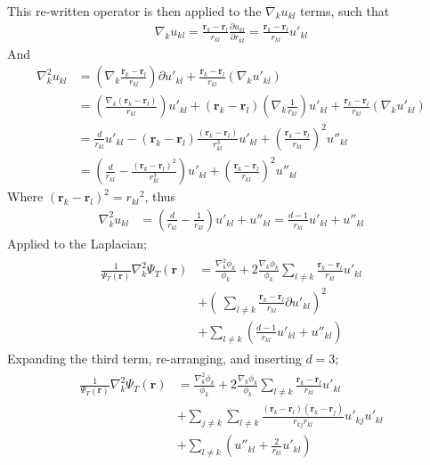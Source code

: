 \documentclass[%
oneside,                 %
final,                   %
10pt]{article}
\begin{document}
\begin{appendices}
\begin{align*}
\end{align*}
This re-written operator is then applied to the $\nabla_k u_{kl}$ terms, such that
\begin{align*}
\nabla_k u_{kl} = \frac{\bm r_k - \bm r_l}{r_{kl}} \frac{\partial u_{kl}}{\partial r_{kl}} = \frac{\bm r_k - \bm r_l}{r_{kl}}  u'_{kl}
\end{align*}
And
\begin{align*}
\nabla_k^2 u_{kl} 
&= \left( \nabla_k  \frac{\bm r_k - \bm r_l}{r_{kl}} \right) \partial u'_{kl}  +  \frac{\bm r_k - \bm r_l}{r_{kl}} \left( \nabla_k   u'_{kl}  \right) \\
&=  \left( \frac{ \nabla_k (\bm r_k - \bm r_l)}{r_{kl}} \right)  u'_{kl}  +   (\bm r_k - \bm r_l) \left( \nabla_k \frac{1 }{r_{kl}} \right)  u'_{kl}  +  \frac{\bm r_k - \bm r_l}{r_{kl}} \left( \nabla_k   u'_{kl}  \right) \\
&= 
\frac{d}{r_{kl}}   u'_{kl}  -  (\bm r_k - \bm r_l) \frac{(\bm r_k - \bm r_l)}{r_{kl}^3}   u'_{kl} 
+  \left( \frac{\bm r_k - \bm r_l}{r_{kl}} \right)^2   u{''}_{kl} \\
&= 
\left( \frac{d}{r_{kl}}   -   \frac{(\bm r_k - \bm r_l)^2}{r_{kl}^3} \right)  u'_{kl} 
+  \left( \frac{\bm r_k - \bm r_l}{r_{kl}} \right)^2   u{''}_{kl}
\end{align*}
Where $(\bm r_k - \bm r_l)^2={r_{kl}}^2$, thus
\begin{align*}
\nabla_k^2 u_{kl} 
&=
\left( \frac{d}{r_{kl}}   -   \frac{1}{r_{kl}} \right)  u'_{kl} 
+    u{''}_{kl} =   \frac{d-1}{r_{kl}}   u'_{kl} 
+    u{''}_{kl}
\end{align*}
Applied to the Laplacian;
\begin{align}
\begin{split}
\frac{1}{\Psi_T(\mathbf{r})} \nabla_k^2\Psi_T(\mathbf{r}) 
&=
\frac{\nabla_k^2 \phi_k}{\phi_k} + 2  \frac{\nabla_k \phi_k}{\phi_k} \sum_{l\ne k}\frac{\bm r_k - \bm r_l}{r_{kl}}  u'_{kl}  \\
&+  \left(\ \sum_{l\ne k} \frac{\bm r_k - \bm r_l}{r_{kl}} \partial u'_{kl} \right)^2 \\
&+ \sum_{l\ne k} \left( \frac{d-1}{r_{kl}}   u'_{kl} +   u{''}_{kl} \right)
\end{split}
\end{align}
Expanding the third term, re-arranging, and inserting $d=3$;
\begin{align}
\begin{split}
\frac{1}{\Psi_T(\mathbf{r})} \nabla_k^2\Psi_T(\mathbf{r}) 
&=
\frac{\nabla_k^2 \phi_k}{\phi_k} + 2  \frac{\nabla_k \phi_k}{\phi_k} \sum_{l\ne k}\frac{\bm r_k - \bm r_l}{r_{kl}}  u'_{kl}  \\
&+  \sum_{j\ne k} \sum_{l\ne k} \frac{(\bm r_k - \bm r_l)(\bm r_k - \bm r_j)}{r_{kj} r_{kl} }  u'_{kj}  u'_{kl} \\
&+ \sum_{l\ne k} \left(   u{''}_{kl} + \frac{2}{r_{kl}}   u'_{kl} \right)
\end{split}
\end{align}


\end{appendices}
\end{document}
